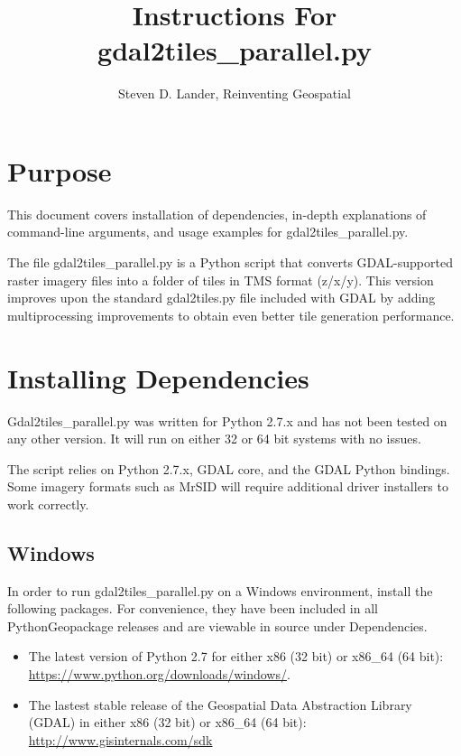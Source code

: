 \documentclass{article}
\title{Instructions For gdal2tiles\_parallel.py}
\author{Steven D. Lander, Reinventing Geospatial}
\begin{document}
\maketitle

\section{Purpose}
This document covers installation of dependencies, in-depth explanations of
command-line arguments, and usage examples for gdal2tiles\_parallel.py.

The file gdal2tiles\_parallel.py is a Python script that converts
GDAL-supported raster imagery files into a folder of tiles in TMS format
(z/x/y).  This version improves upon the standard gdal2tiles.py file included
with GDAL by adding multiprocessing improvements to obtain even better tile
generation performance.

\section{Installing Dependencies}
Gdal2tiles\_parallel.py was written for Python 2.7.x and has not been tested on
any other version.  It will run on either 32 or 64 bit systems with no issues.

The script relies on Python 2.7.x, GDAL core, and the GDAL Python bindings.
Some imagery formats such as MrSID will require additional driver installers to
work correctly.
\subsection{Windows}
In order to run gdal2tiles\_parallel.py on a Windows environment, install
the following packages.  For convenience, they have been included in all
PythonGeopackage releases and are viewable in source under Dependencies.
\begin{itemize}
    \item
        The latest version of Python 2.7 for either x86 (32 bit) or x86\_64
        (64 bit): 
        \url{https://www.python.org/downloads/windows/}.
    \item
        The lastest stable release of the Geospatial Data Abstraction Library
        (GDAL) in either x86 (32 bit) or x86\_64 (64 bit):
        \url{http://www.gisinternals.com/sdk}
\end{itemize}
\end{document}
